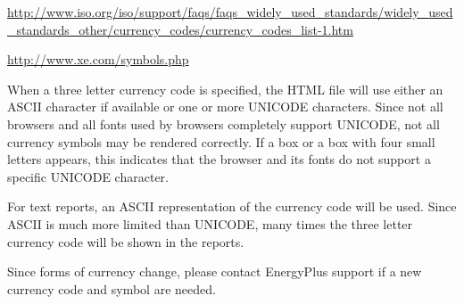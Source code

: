 \url{http://www.iso.org/iso/support/faqs/faqs_widely_used_standards/widely_used_standards_other/currency_codes/currency_codes_list-1.htm}

\url{http://www.xe.com/symbols.php}

When a three letter currency code is specified, the HTML file will use either an ASCII character if available or one or more UNICODE characters. Since not all browsers and all fonts used by browsers completely support UNICODE, not all currency symbols may be rendered correctly. If a box or a box with four small letters appears, this indicates that the browser and its fonts do not support a specific UNICODE character.

For text reports, an ASCII representation of the currency code will be used. Since ASCII is much more limited than UNICODE, many times the three letter currency code will be shown in the reports.

Since forms of currency change, please contact EnergyPlus support if a new currency code and symbol are needed.
